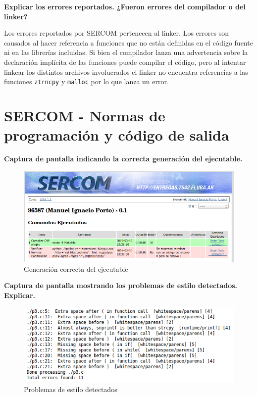 \documentclass{article}
\begin{document}
\textbf{Explicar los errores reportados. ¿Fueron errores del compilador o del linker?}\newline

    Los errores reportados por SERCOM pertenecen al linker. Los errores son causados al hacer referencia a funciones que no están definidas en el código fuente ni en las librerías incluidas. Si bien el compilador lanza una advertencia sobre la declaración implícita de las funciones puede compilar el código, pero al intentar linkear los distintos archivos involucrados el linker no encuentra referencias a las funciones \texttt{ztrncpy} y \texttt{malloc} por lo que lanza un error.
    
\section{SERCOM - Normas de programación y código de salida}
    
\textbf{Captura de pantalla indicando la correcta generación del ejecutable.}
    \begin{figure}[H]
        \includegraphics[width=\columnwidth]{p3_compile}
        \caption{Generación correcta del ejecutable}
    \end{figure}

\textbf{Captura de pantalla mostrando los problemas de estilo detectados. Explicar.}    
    \begin{figure}[H]
        \includegraphics[width=\columnwidth]{p3_style}
        \caption{Problemas de estilo detectados}
    \end{figure}
    
\end{document}
